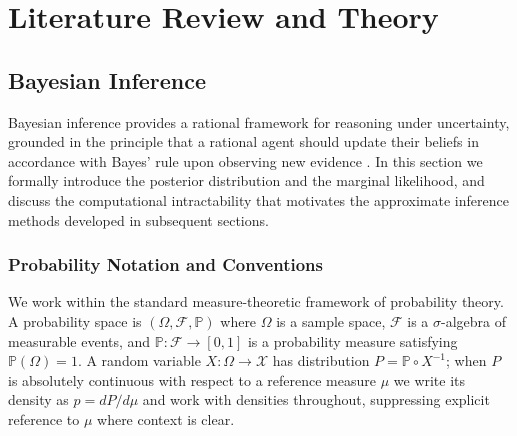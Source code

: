 \chapter{Literature Review and Theory}
\label{chap:literature_review_and_theory}
\section{Bayesian Inference}

Bayesian inference provides a rational framework for reasoning under uncertainty, grounded in the principle that a rational agent should update their beliefs in accordance with Bayes' rule upon observing new evidence \citep{bernardo1994}. In this section we formally introduce the posterior distribution and the marginal likelihood, and discuss the computational intractability that motivates the approximate inference methods developed in subsequent sections.
    \subsection{Probability Notation and Conventions}

    We work within the standard measure-theoretic framework of probability theory. A probability space is $(\Omega, \mathcal{F}, \mathbb{P})$ where $\Omega$ is a sample space, $\mathcal{F}$ is a $\sigma$-algebra of measurable events, and $\mathbb{P} : \mathcal{F} \to [0,1]$ is a probability measure satisfying $\mathbb{P}(\Omega) = 1$. A random variable $X : \Omega \to \mathcal{X}$ has distribution $P = \mathbb{P} \circ X^{-1}$; when $P$ is absolutely continuous with respect to a reference measure $\mu$ we write its density as $p = dP/d\mu$ and work with densities throughout, suppressing explicit reference to $\mu$ where context is clear.

